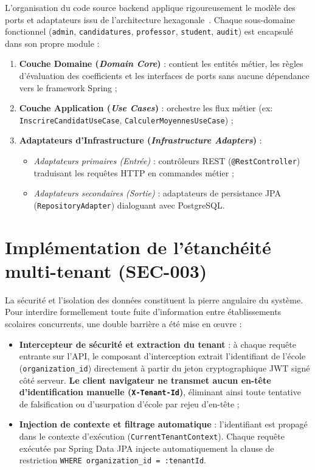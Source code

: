 L'organisation du code source backend applique rigoureusement le modèle des ports et adaptateurs issu de l'architecture hexagonale~\cite{cockburn2005hexagonal}. Chaque sous-domaine fonctionnel (\texttt{admin}, \texttt{candidatures}, \texttt{professor}, \texttt{student}, \texttt{audit}) est encapsulé dans son propre module :

\begin{enumerate}
  \item \textbf{Couche Domaine (\emph{Domain Core})} : contient les entités métier, les règles d'évaluation des coefficients et les interfaces de ports sans aucune dépendance vers le framework Spring ;
  \item \textbf{Couche Application (\emph{Use Cases})} : orchestre les flux métier (ex: \texttt{InscrireCandidatUseCase}, \texttt{CalculerMoyennesUseCase}) ;
  \item \textbf{Adaptateurs d'Infrastructure (\emph{Infrastructure Adapters})} :
    \begin{itemize}
      \item \emph{Adaptateurs primaires (Entrée)} : contrôleurs REST (\texttt{@RestController}) traduisant les requêtes HTTP en commandes métier ;
      \item \emph{Adaptateurs secondaires (Sortie)} : adaptateurs de persistance JPA (\texttt{RepositoryAdapter}) dialoguant avec PostgreSQL.
    \end{itemize}
\end{enumerate}

\section{Implémentation de l'étanchéité multi-tenant (SEC-003)}

La sécurité et l'isolation des données constituent la pierre angulaire du système. Pour interdire formellement toute fuite d'information entre établissements scolaires concurrents, une double barrière a été mise en œuvre :

\begin{itemize}
  \item \textbf{Intercepteur de sécurité et extraction du tenant} : à chaque requête entrante sur l'API, le composant d'interception extrait l'identifiant de l'école (\texttt{organization\_id}) directement à partir du jeton cryptographique JWT signé côté serveur. \textbf{Le client navigateur ne transmet aucun en-tête d'identification manuelle (\texttt{X-Tenant-Id})}, éliminant ainsi toute tentative de falsification ou d'usurpation d'école par rejeu d'en-tête ;
  \item \textbf{Injection de contexte et filtrage automatique} : l'identifiant est propagé dans le contexte d'exécution (\texttt{CurrentTenantContext}). Chaque requête exécutée par Spring Data JPA injecte automatiquement la clause de restriction \texttt{WHERE organization\_id = :tenantId}.
\end{itemize}

